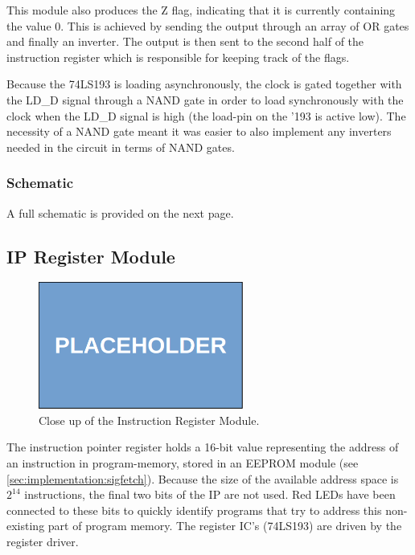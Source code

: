 This module also produces the Z flag, indicating that it is currently containing the value 0. This is achieved by sending the output through an array of OR gates and finally an inverter. The output is then sent to the second half of the instruction register which is responsible for keeping track of the flags.

Because the 74LS193 is loading asynchronously, the clock is gated together with the LD\_D signal through a NAND gate in order to load synchronously with the clock when the LD\_D signal is high (the load-pin on the '193 is active low). The necessity of a NAND gate meant it was easier to also implement any inverters needed in the circuit in terms of NAND gates.


\subsubsection{Schematic}
A full schematic is provided on the next page.



\subsection{IP Register Module}
\begin{figure}[H]
  \centering
  \includegraphics[width=0.6\textwidth]{img/placeholder}
  \caption{Close up of the Instruction Register Module.}
  \label{fig:iregcloseup}
\end{figure}

The instruction pointer register holds a 16-bit value representing the address of an instruction in program-memory, stored in an EEPROM module (see \ref{sec:implementation:sigfetch}). Because the size of the available address space is $2^{14}$ instructions, the final two bits of the IP are not used. Red LEDs have been connected to these bits to quickly identify programs that try to address this non-existing part of program memory. The register IC's (74LS193) are driven by the register driver.

